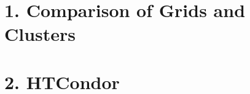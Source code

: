 \documentclass[12pt]{article}
\date{\today}
\begin{document}
\maketitle

\section*{1. Comparison of Grids and Clusters}

\section*{2. HTCondor}
\subsection*{}



\end{document}
